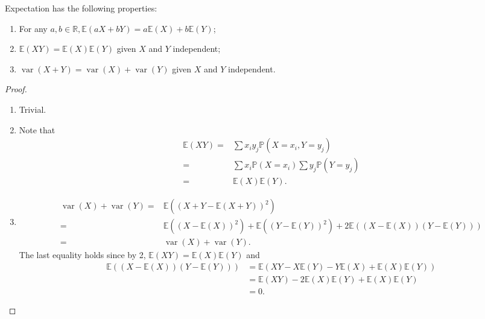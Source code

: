 \documentclass[11pt,singlecolumn, openany, citestyle=authoryear]{elegantbook}
\begin{document}
\begin{CJK}{UTF8}{gbsn}
\begin{lemma}
    Expectation has the following properties:
    \begin{enumerate}
        \item For any $a,b \in \mathbb{R}, 
        \mathbb{E}(aX+bY) = a\mathbb{E}(X)+b\mathbb{E}(Y)$;
        \item $\mathbb{E}(XY)=\mathbb{E}(X)\mathbb{E}(Y)$ given $X$ and $Y$ independent;
        \item $\operatorname{var}(X+Y)=\operatorname{var}(X)+\operatorname{var}(Y)$ given $X$ and $Y$ independent.
    \end{enumerate} 
\end{lemma}
\begin{proof}
    \begin{enumerate}
        \item Trivial.
        \item Note that
        \begin{align*}
            \mathbb{E}(XY) =& \sum x_iy_j \mathbb{P}(X=x_i,Y=y_j)\\
            =&\sum x_i \mathbb{P}(X=x_i)
            \sum y_j\mathbb{P}(Y=y_j)\\
            =&\mathbb{E}(X)\mathbb{E}(Y).
        \end{align*} 
        \item 
        \begin{align*}
            \operatorname{var}(X)+
            \operatorname{var}(Y) =& \mathbb{E}((X+Y-\mathbb{E}(X+Y))^2)\\
            =& \mathbb{E}((X-\mathbb{E}(X))^2)+\mathbb{E}((Y-\mathbb{E}(Y))^2)+
            2\mathbb{E}((X-\mathbb{E}(X))(Y-\mathbb{E}(Y)))\\
            = & \operatorname{var}(X)+\operatorname{var}(Y).
        \end{align*} 
        The last equality holds since by 2, $\mathbb{E}(XY) = \mathbb{E}(X)\mathbb{E}(Y)$
        and 
        \begin{align*}
            \mathbb{E}((X-\mathbb{E}(X))(Y-\mathbb{E}(Y))) &= 
            \mathbb{E}(XY-X\mathbb{E}(Y)-Y\mathbb{E}(X)+\mathbb{E}(X)\mathbb{E}(Y))\\
            &= \mathbb{E}(XY)-2\mathbb{E}(X)\mathbb{E}(Y)+\mathbb{E}(X)\mathbb{E}(Y)\\
            &=0.  
        \end{align*}
    \end{enumerate}
\end{proof}


\end{CJK}
\end{document}
